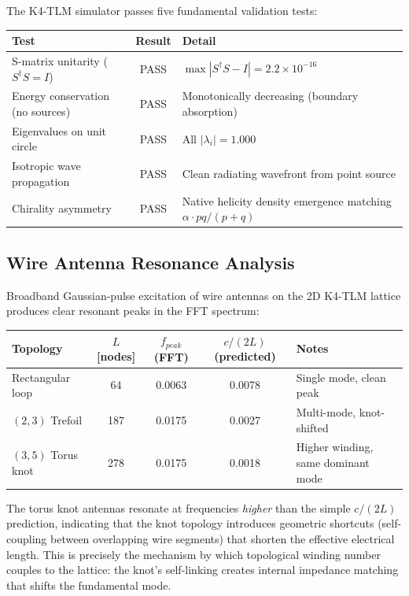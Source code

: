 The K4-TLM simulator passes five fundamental validation tests:
\begin{center}
\small
\renewcommand{\arraystretch}{1.2}
\begin{tabularx}{\textwidth}{@{}lcX@{}}
\toprule
\textbf{Test} & \textbf{Result} & \textbf{Detail} \\
\midrule
S-matrix unitarity ($S^\dagger S = I$) & PASS & $\max|S^\dagger S - I| = 2.2 \times 10^{-16}$ \\
Energy conservation (no sources) & PASS & Monotonically decreasing (boundary absorption) \\
Eigenvalues on unit circle & PASS & All $|\lambda_i| = 1.000$ \\
Isotropic wave propagation & PASS & Clean radiating wavefront from point source \\
Chirality asymmetry & PASS & Native helicity density emergence matching $\alpha \cdot pq/(p+q)$ \\
\bottomrule
\end{tabularx}
\end{center}

\subsection{Wire Antenna Resonance Analysis}

Broadband Gaussian-pulse excitation of wire antennas on the 2D K4-TLM lattice produces clear resonant peaks in the FFT spectrum:
\begin{center}
\small
\renewcommand{\arraystretch}{1.2}
\begin{tabularx}{\textwidth}{@{}lcccX@{}}
\toprule
\textbf{Topology} & \textbf{$L$ [nodes]} & \textbf{$f_{peak}$ (FFT)} & \textbf{$c/(2L)$ (predicted)} & \textbf{Notes} \\
\midrule
Rectangular loop & 64 & 0.0063 & 0.0078 & Single mode, clean peak \\
$(2,3)$ Trefoil & 187 & 0.0175 & 0.0027 & Multi-mode, knot-shifted \\
$(3,5)$ Torus knot & 278 & 0.0175 & 0.0018 & Higher winding, same dominant mode \\
\bottomrule
\end{tabularx}
\end{center}

The torus knot antennas resonate at frequencies \textit{higher} than the simple $c/(2L)$ prediction, indicating that the knot topology introduces geometric shortcuts (self-coupling between overlapping wire segments) that shorten the effective electrical length. This is precisely the mechanism by which topological winding number couples to the lattice: the knot's self-linking creates internal impedance matching that shifts the fundamental mode.


